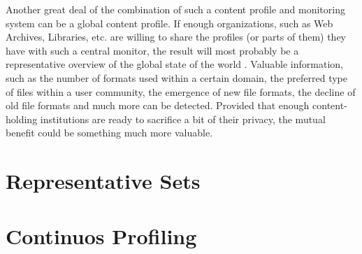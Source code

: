 Another great deal of the combination of such a content profile and monitoring system can be a global content profile. If enough organizations, such as Web Archives, Libraries, etc. are willing to share the profiles (or parts of them) they have with such a central monitor, the result will most probably be a representative overview of the global state of the world \cite{duretec:2012:watch}. Valuable information, such as the number of formats used within a certain domain, the preferred type of files within a user community, the emergence of new file formats, the decline of old file formats and much more can be detected. Provided that enough content-holding institutions are ready to sacrifice a bit of their privacy, the mutual benefit could be something much more valuable.

\section{Representative Sets}
\label{sec:representative_sets}


\section{Continuos Profiling}
